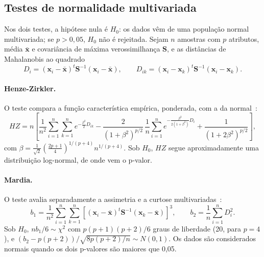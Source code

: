 \documentclass[12pt,a4paper]{article}
\begin{document}
\subsection{Testes de normalidade multivariada}\label{sec:testes_normalidade}

Nos dois testes, a hipótese nula é $H_0$: os dados vêm de uma população normal multivariada; se $p > 0{,}05$, $H_0$ não é rejeitada. Sejam $n$ amostras com $p$ atributos, média $\bar{\mathbf{x}}$ e covariância de máxima verossimilhança $\mathbf{S}$, e as distâncias de Mahalanobis ao quadrado
\begin{equation}
  D_i = (\mathbf{x}_i - \bar{\mathbf{x}})^t\mathbf{S}^{-1}(\mathbf{x}_i - \bar{\mathbf{x}}), \qquad
  D_{ik} = (\mathbf{x}_i - \mathbf{x}_k)^t\mathbf{S}^{-1}(\mathbf{x}_i - \mathbf{x}_k).
\end{equation}

\paragraph{Henze-Zirkler.} O teste compara a função característica empírica, ponderada, com a da normal~\cite{henze}:
\begin{equation}
  HZ = n\left[\frac{1}{n^2}\sum_{i=1}^{n}\sum_{k=1}^{n} e^{-\frac{\beta^2}{2}D_{ik}}
  - \frac{2}{(1+\beta^2)^{p/2}}\,\frac{1}{n}\sum_{i=1}^{n} e^{-\frac{\beta^2}{2(1+\beta^2)}D_i}
  + \frac{1}{(1+2\beta^2)^{p/2}}\right],
  \label{eq:hz}
\end{equation}
com $\beta = \frac{1}{\sqrt{2}}\left(\frac{2p+1}{4}\right)^{1/(p+4)} n^{1/(p+4)}$. Sob $H_0$, $HZ$ segue aproximadamente uma distribuição log-normal, de onde vem o p-valor.

\paragraph{Mardia.} O teste avalia separadamente a assimetria e a curtose multivariadas~\cite{mardia}:
\begin{equation}
  b_{1} = \frac{1}{n^2}\sum_{i=1}^{n}\sum_{k=1}^{n}\left[(\mathbf{x}_i - \bar{\mathbf{x}})^t\mathbf{S}^{-1}(\mathbf{x}_k - \bar{\mathbf{x}})\right]^3, \qquad
  b_{2} = \frac{1}{n}\sum_{i=1}^{n} D_i^2.
  \label{eq:mardia}
\end{equation}
Sob $H_0$, $n b_1/6 \sim \chi^2$ com $p(p+1)(p+2)/6$ graus de liberdade (20, para $p = 4$), e $(b_2 - p(p+2))/\sqrt{8p(p+2)/n} \sim N(0,1)$. Os dados são considerados normais quando os dois p-valores são maiores que 0,05.
\end{document}
